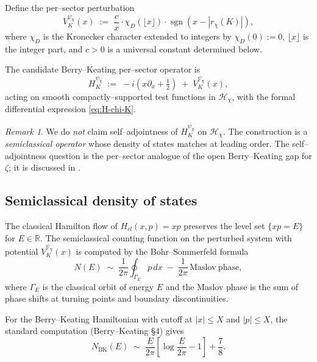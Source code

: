 \documentclass[11pt]{amsart}
\theoremstyle{definition}
\theoremstyle{remark}
\newtheorem{remark}[theorem]{Remark}
\DeclareMathOperator{\sgn}{sgn}
\newcommand{\R}{\mathbb{R}}
\newcommand{\BK}{\mathrm{BK}}
\begin{document}
Define the per--sector perturbation
\begin{equation}\label{eq:V}
   V_K^{\psi_\chi}(x)
   \;:=\;
   \frac{c}{x} \cdot \chi_D(\lfloor x \rfloor) \cdot
   \sgn(x - |r_\chi(K)|) ,
\end{equation}
where \(\chi_D\) is the Kronecker character extended to integers by
\(\chi_D(0) := 0\), \(\lfloor x \rfloor\) is the integer part, and
\(c > 0\) is a universal constant determined below.

The candidate Berry--Keating per--sector operator is
\begin{equation}\label{eq:H-chi-K}
   H_K^{\psi_\chi}
   \;:=\;
   -i\!\left( x \partial_x + \tfrac{1}{2} \right)
   \;+\;
   V_K^{\psi_\chi}(x) ,
\end{equation}
acting on smooth compactly--supported test functions in
\(\mathcal H_\chi\), with the formal differential expression
\eqref{eq:H-chi-K}.

\begin{remark}\label{rem:self-adjoint}
We do \emph{not} claim self--adjointness of \(H_K^{\psi_\chi}\) on
\(\mathcal H_\chi\). The construction is a \emph{semiclassical
operator} whose density of states matches  at leading
order. The self--adjointness question is the per--sector analogue of
the open Berry--Keating gap for \(\zeta\); it is discussed in
.
\end{remark}

\subsection{Semiclassical density of states}\label{ssec:density-states}
The classical Hamilton flow of \(H_{cl}(x,p) = xp\) preserves the
level set \(\{xp = E\}\) for \(E \in \R\). The semiclassical counting
function on the perturbed system with potential
\(V_K^{\psi_\chi}(x)\) is computed by the Bohr--Sommerfeld formula
\begin{equation}\label{eq:BS}
   N(E) \;\sim\; \frac{1}{2\pi}
   \oint_{\Gamma_E} p\, dx
   \;-\;
   \frac{1}{2\pi}\, \mathrm{Maslov\ phase} ,
\end{equation}
where \(\Gamma_E\) is the classical orbit of energy \(E\) and the
Maslov phase is the sum of phase shifts at turning points and
boundary discontinuities.

For the Berry--Keating Hamiltonian with cutoff at \(|x| \le X\) and
\(|p| \le X\), the standard computation
(Berry--Keating \cite{BerryKeating1999b} §4) gives
\[
   N_{\BK}(E)
   \;\sim\; \frac{E}{2\pi}\!\left[ \log\frac{E}{2\pi} - 1 \right] + \frac{7}{8} .
\]
\end{document}
